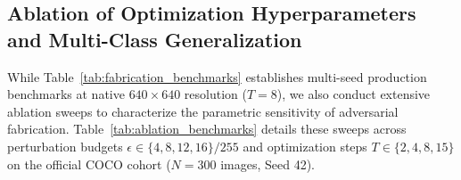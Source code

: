 \documentclass[preprint,12pt]{elsarticle}
\begin{document}
\subsection{Ablation of Optimization Hyperparameters and Multi-Class Generalization}
\label{sec:ablation_studies}

While Table~\ref{tab:fabrication_benchmarks} establishes multi-seed production benchmarks at native $640\times 640$ resolution ($T=8$), we also conduct extensive ablation sweeps to characterize the parametric sensitivity of adversarial fabrication. Table~\ref{tab:ablation_benchmarks} details these sweeps across perturbation budgets $\epsilon \in \{4, 8, 12, 16\}/255$ and optimization steps $T \in \{2, 4, 8, 15\}$ on the official COCO cohort ($N=300$ images, Seed 42).

\begin{table}[!htbp]
\centering
\caption{Ablation analysis of adversarial candidate fabrication across perturbation budgets $\epsilon$ and PGD iteration steps $T$ on official COCO \texttt{val2017} ($N=300$ images, Seed 42). Evaluates detection precision metrics, total false positive counts (FP) with phantom density per frame, binary attack success ($\mathrm{ASR}_{\mathrm{fab}}$), and resultant detection $\mathrm{mAP}_{50}$ and $\mathrm{mAP}_{75}$, illustrating monotonic scaling from $\epsilon=4$ to $12$ followed by step budget limit at $\epsilon=16$ ($T \cdot \alpha = 8 \times 2/255 = 16/255$), and continued scaling under expanded iterations ($T=15$). Reference benchmark configuration ($\epsilon=16/255, T=8$) matches the multi-seed evaluation in Table~\ref{tab:fabrication_benchmarks}.}
\label{tab:ablation_benchmarks}
\renewcommand{\arraystretch}{1.15}
\end{table}
\end{document}
